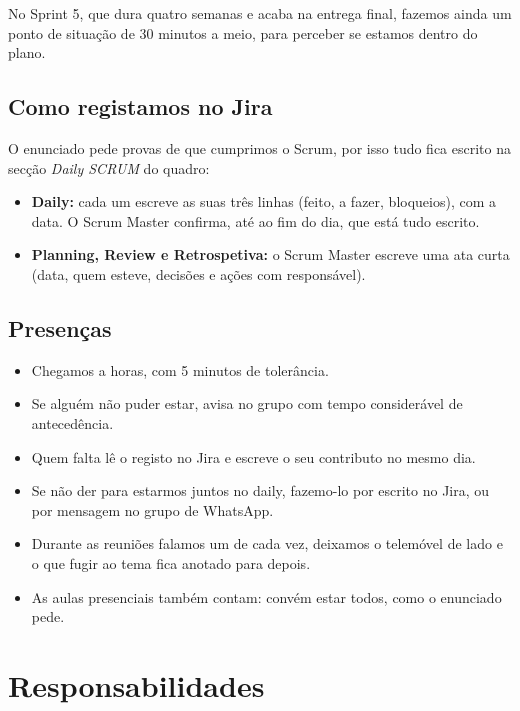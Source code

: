 \documentclass[11pt,a4paper]{article}
\begin{document}
No Sprint 5, que dura quatro semanas e acaba na entrega final, fazemos ainda um ponto de situação de 30 minutos a meio, para perceber se estamos dentro do plano.

\subsection{Como registamos no Jira}

O enunciado pede provas de que cumprimos o Scrum, por isso tudo fica escrito na secção \textit{Daily SCRUM} do quadro:

\begin{itemize}
  \item \textbf{Daily:} cada um escreve as suas três linhas (feito, a fazer, bloqueios), com a data. O Scrum Master confirma, até ao fim do dia, que está tudo escrito.
  \item \textbf{Planning, Review e Retrospetiva:} o Scrum Master escreve uma ata curta (data, quem esteve, decisões e ações com responsável).
\end{itemize}

\subsection{Presenças}

\begin{itemize}
  \item Chegamos a horas, com 5 minutos de tolerância.
  \item Se alguém não puder estar, avisa no grupo com tempo considerável de antecedência.
  \item Quem falta lê o registo no Jira e escreve o seu contributo no mesmo dia.
  \item Se não der para estarmos juntos no daily, fazemo-lo por escrito no Jira, ou por mensagem no grupo de WhatsApp.
  \item Durante as reuniões falamos um de cada vez, deixamos o telemóvel de lado e o que fugir ao tema fica anotado para depois.
  \item As aulas presenciais também contam: convém estar todos, como o enunciado pede.
\end{itemize}

\section{Responsabilidades}
\end{document}
